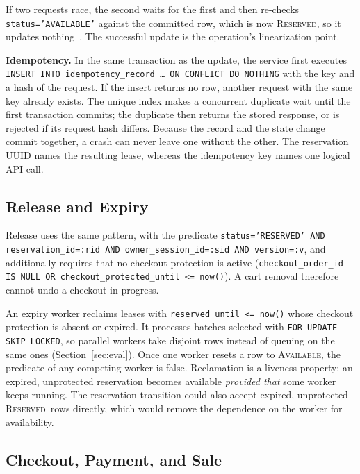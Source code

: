 \documentclass[conference]{IEEEtran}
\newcommand{\Av}{\textsc{Available}}
\newcommand{\Rs}{\textsc{Reserved}}
\begin{document}
If two requests race, the second waits for the first and then
re-checks \texttt{status='AVAILABLE'} against the committed row, which
is now \Rs, so it updates nothing~\cite{refPGIsolation}. The
successful update is the operation's linearization point.

\textbf{Idempotency.}
In the same transaction as the update, the service first executes
\texttt{INSERT INTO idempotency\_record \ldots\ ON CONFLICT DO NOTHING}
with the key and a hash of the request. If the insert returns no row,
another request with the same key already exists. The unique index
makes a concurrent duplicate wait until the first transaction
commits; the duplicate then returns the stored response, or is
rejected if its request hash differs. Because the record and the
state change commit together, a crash can never leave one without the
other. The reservation UUID names the resulting lease, whereas the
idempotency key names one logical API call.

\subsection{Release and Expiry}

Release uses the same pattern, with the predicate
\texttt{status='RESERVED' AND reservation\_id=:rid AND
owner\_session\_id=:sid AND version=:v}, and additionally requires that
no checkout protection is active
(\texttt{checkout\_order\_id IS NULL OR checkout\_protected\_until
<= now()}). A cart removal therefore cannot undo a checkout in
progress.

An expiry worker reclaims leases with
\texttt{reserved\_until <= now()} whose checkout protection is absent
or expired. It processes batches selected with
\texttt{FOR UPDATE SKIP LOCKED}, so parallel workers take disjoint
rows instead of queuing on the same ones (Section~\ref{sec:eval}).
Once one worker resets a row to \Av, the predicate of any competing
worker is false. Reclamation is a liveness property: an expired,
unprotected reservation becomes available \emph{provided that} some
worker keeps running. The reservation transition could also accept
expired, unprotected \Rs\ rows directly, which would remove the
dependence on the worker for availability.

\subsection{Checkout, Payment, and Sale}
\end{document}

